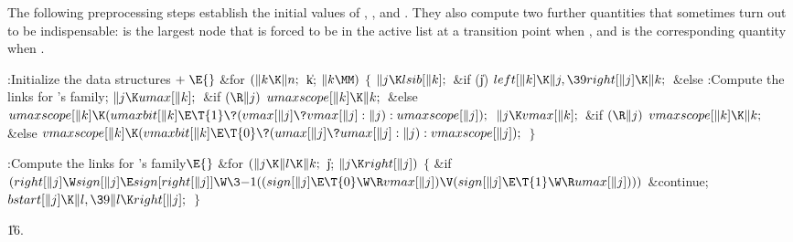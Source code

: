 The following preprocessing steps establish the initial values of ,
, and . They also compute two further quantities
that sometimes
turn out to be indispensable:  is the largest node that
is
forced to be in the active list at a transition point
when , and  is
the corresponding quantity when .

\Y\B\4:Initialize the data structures\X${}\mathrel+\E{}$\6
\&{for} ${}(\|k\K\|n;{}$ \|k; ${}\|k\MM){}$\5
${}\{{}$\1\6
${}\|j\K\\{lsib}[\|k];{}$\6
\&{if} (\|j)\1\5
${}\\{left}[\|k]\K\|j,\39\\{right}[\|j]\K\|k;{}$\2\6
\&{else}\1\5
:Compute the  links for 's family\X;\2\6
${}\|j\K\\{umax}[\|k];{}$\6
\&{if} ${}(\R\|j){}$\1\5
${}\\{umaxscope}[\|k]\K\|k;{}$\2\6
\&{else}\1\5
${}\\{umaxscope}[\|k]\K(\\{umaxbit}[\|k]\E\T{1}\?(\\{vmax}[\|j]\?\\{vmax}[\|j]:%
\|j):\\{umaxscope}[\|j]);{}$\2\6
${}\|j\K\\{vmax}[\|k];{}$\6
\&{if} ${}(\R\|j){}$\1\5
${}\\{vmaxscope}[\|k]\K\|k;{}$\2\6
\&{else}\1\5
${}\\{vmaxscope}[\|k]\K(\\{vmaxbit}[\|k]\E\T{0}\?(\\{umax}[\|j]\?\\{umax}[\|j]:%
\|j):\\{vmaxscope}[\|j]);{}$\2\6
\4${}\}{}$\2\par
\fi

\B{}:Compute the  links for 's
family\X${}\E{}$\6
\&{for} ${}(\|j\K\|l\K\|k;{}$ \|j; ${}\|j\K\\{right}[\|j]){}$\5
${}\{{}$\1\6
\&{if} ${}(\\{right}[\|j]\W\\{sign}[\|j]\E\\{sign}[\\{right}[\|j]]\W\3{-1}((%
\\{sign}[\|j]\E\T{0}\W\R\\{vmax}[\|j])\V(\\{sign}[\|j]\E\T{1}\W\R\\{umax}[%
\|j]))){}$\1\5
\&{continue};\2\6
${}\\{bstart}[\|j]\K\|l,\39\|l\K\\{right}[\|j];{}$\6
\4${}\}{}$\2\par
\U16.\fi

